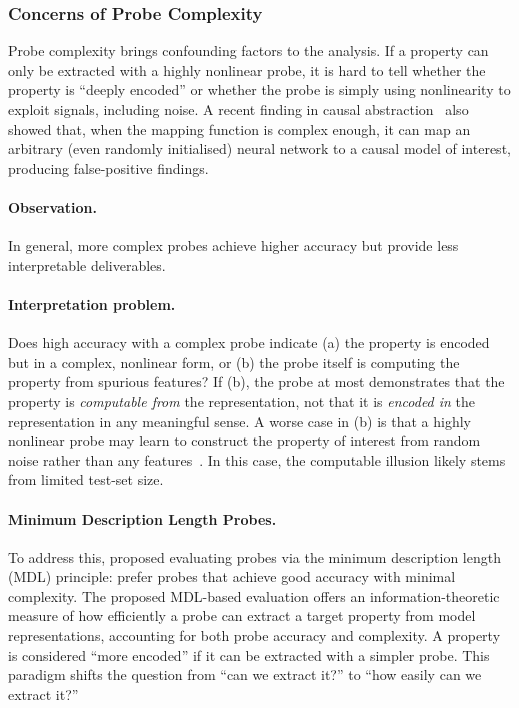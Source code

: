 \subsubsection{Concerns of Probe Complexity}
Probe complexity brings confounding factors to the analysis. If a property can only be extracted with a highly nonlinear probe, it is hard to tell whether the property is ``deeply encoded'' or whether the probe is simply using nonlinearity to exploit signals, including noise. A recent finding in causal abstraction~ also showed that, when the mapping function is complex enough, it can map an arbitrary (even randomly initialised) neural network to a causal model of interest, producing false-positive findings.

\begin{insightbox}
\paragraph{Observation.} In general, more complex probes achieve higher accuracy but provide less interpretable deliverables.\\

\paragraph{Interpretation problem.} Does high accuracy with a complex probe indicate (a) the property is encoded but in a complex, nonlinear form, or (b) the probe itself is computing the property from spurious features? If (b), the probe at most demonstrates that the property is \emph{computable from} the representation, not that it is \emph{encoded in} the representation in any meaningful sense. A worse case in (b) is that a highly nonlinear probe may learn to construct the property of interest from random noise rather than any features~. In this case, the computable illusion likely stems from limited test-set size.
\end{insightbox}

\paragraph{Minimum Description Length Probes.}
To address this,  proposed evaluating probes via the minimum description length (MDL) principle: prefer probes that achieve good accuracy with minimal complexity. The proposed MDL-based evaluation offers an information-theoretic measure of how efficiently a probe can extract a target property from model representations, accounting for both probe accuracy and complexity. A property is considered ``more encoded'' if it can be extracted with a simpler probe. This paradigm shifts the question from ``can we extract it?'' to ``how easily can we extract it?''

